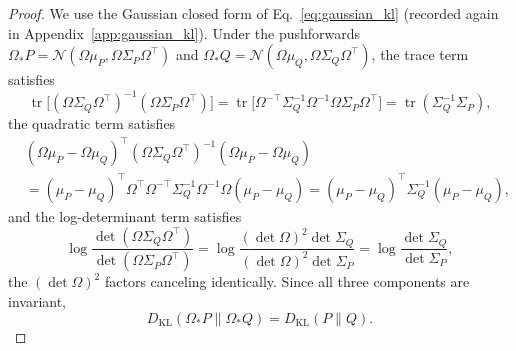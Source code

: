 \begin{proof}
We use the Gaussian closed form of Eq.~\eqref{eq:gaussian_kl} (recorded again in Appendix~\ref{app:gaussian_kl}). Under the pushforwards $\Omega_* P = \mathcal{N}(\Omega\mu_P, \Omega\Sigma_P\Omega^\top)$ and $\Omega_* Q = \mathcal{N}(\Omega\mu_Q, \Omega\Sigma_Q\Omega^\top)$, the trace term satisfies
\begin{equation}
\operatorname{tr}\big[(\Omega\Sigma_Q\Omega^\top)^{-1}(\Omega\Sigma_P\Omega^\top)\big] = \operatorname{tr}\big[\Omega^{-\top}\Sigma_Q^{-1}\Omega^{-1}\Omega\Sigma_P\Omega^\top\big] = \operatorname{tr}(\Sigma_Q^{-1}\Sigma_P),
\end{equation}
the quadratic term satisfies
\begin{align}
&(\Omega\mu_P - \Omega\mu_Q)^\top (\Omega\Sigma_Q\Omega^\top)^{-1} (\Omega\mu_P - \Omega\mu_Q) \nonumber\\
&= (\mu_P - \mu_Q)^\top \Omega^\top \Omega^{-\top}\Sigma_Q^{-1}\Omega^{-1}\Omega (\mu_P - \mu_Q) = (\mu_P - \mu_Q)^\top \Sigma_Q^{-1}(\mu_P - \mu_Q),
\end{align}
and the log-determinant term satisfies
\begin{equation}
\log\frac{\det(\Omega\Sigma_Q\Omega^\top)}{\det(\Omega\Sigma_P\Omega^\top)} = \log\frac{(\det\Omega)^2 \det\Sigma_Q}{(\det\Omega)^2 \det\Sigma_P} = \log\frac{\det\Sigma_Q}{\det\Sigma_P},
\end{equation}
the $(\det\Omega)^2$ factors canceling identically. Since all three components are invariant,
\begin{equation}
D_{\mathrm{KL}}(\Omega_* P \| \Omega_* Q)
= D_{\mathrm{KL}}(P \| Q).
\end{equation}
\end{proof}


